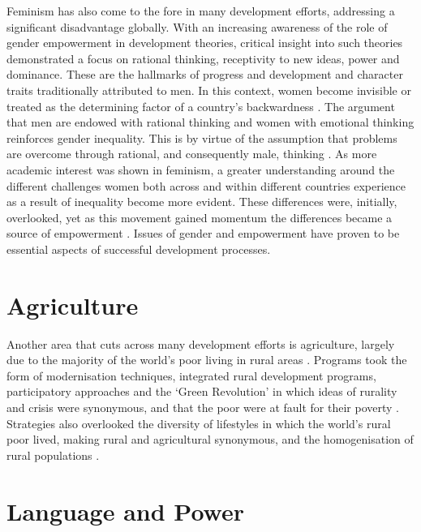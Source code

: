 Feminism has also come to the fore in many development efforts, addressing a significant disadvantage globally. With an increasing awareness of the role of gender empowerment in development theories, critical insight into such theories demonstrated a focus on rational thinking, receptivity to new ideas, power and dominance. These are the hallmarks of progress and development and character traits traditionally attributed to men. In this context, women become invisible or treated as the determining factor of a country's backwardness \citep[][p280]{Hartwick2015}. The argument that men are endowed with rational thinking and women with emotional thinking reinforces gender inequality. This is by virtue of the assumption that problems are overcome through rational, and consequently male, thinking \citep[][p273]{Hartwick2015}. As more academic interest was shown in feminism, a greater understanding around the different challenges women both across and within different countries experience as a result of inequality become more evident. These differences were, initially, overlooked, yet as this movement gained momentum the differences became a source of empowerment \citep[][p276]{Hartwick2015}. Issues of gender and empowerment have proven to be essential aspects of successful development processes.

\section{Agriculture}
Another area that cuts across many development efforts is agriculture, largely due to the majority of the world's poor living in rural areas \citep{Ramisch2009}. Programs took the form of modernisation techniques, integrated rural development programs, participatory approaches and the `Green Revolution' in which ideas of rurality and crisis were synonymous, and that the poor were at fault for their poverty \citep{Ramisch2009}. Strategies also overlooked the diversity of lifestyles in which the world's rural poor lived, making rural and agricultural synonymous, and the homogenisation of rural populations \citep{Ramisch2009}.



\section{Language and Power}

